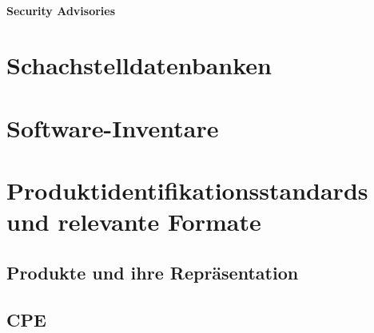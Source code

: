 
\paragraph{Security Advisories}



\section{Schachstelldatenbanken}\label{sec:security-vulnerability-databases}



\section{Software-Inventare}\label{sec:def-inventories}




\section{Produktidentifikationsstandards und relevante Formate}

\subsection{Produkte und ihre Repräsentation}


\subsection{CPE}

